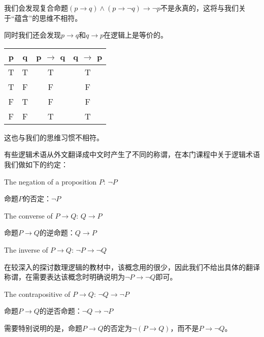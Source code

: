 \documentclass{article}
\begin{document}
\begin{CJK}{UTF8}{gbsn}
    我们会发现复合命题$(p\to q) \land (p\to \lnot q) \to \lnot p$不是永真的，这将与我们关于“蕴含”的思维不相符。

    同时我们还会发现$p \to q$和$q\to p$在逻辑上是等价的。

    \begin{tabular}{cc|cc}
    p& q& p $\to$ q&q $\to$ p\\
    \hline
    T&T&T&T\\
    T&F&F&F\\
    F&T&F&F\\
    F&F&T&T\\
    \end{tabular}\hspace{0.87cm}

    这也与我们的思维习惯不相符。

    

  
  有些逻辑术语从外文翻译成中文时产生了不同的称谓，在本门课程中关于逻辑术语我们做如下的约定：


  The negation of a proposition $P$: $\lnot P$

  命题$P$的否定：$\lnot P$

  The converse of $P\to Q$: $Q \to P$

  命题$P\to Q$的逆命题：$Q\to P$



  The inverse of $P\to Q$: $\lnot P \to \lnot Q$
  
  在较深入的探讨数理逻辑的教材中，该概念用的很少，因此我们不给出具体的翻译称谓，在需要表达该概念时明确说明为$\lnot P \to \lnot Q$即可。

  
  The contrapositive of $P\to Q$: $\lnot Q \to \lnot P$

  命题$P\to Q$的逆否命题：$\lnot Q \to \lnot P$

  需要特别说明的是，命题$P\to Q$的否定为$\lnot (P \to Q)$，而不是$P \to \lnot Q$。 

  
  

  
\end{CJK}
\end{document}
